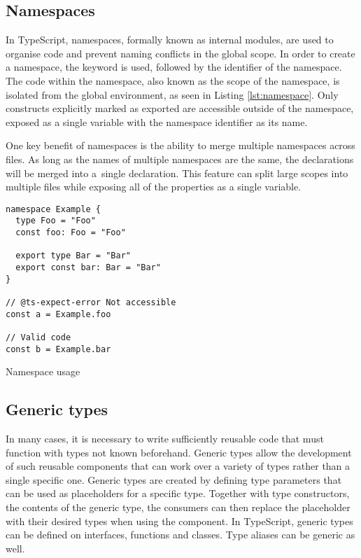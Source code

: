 \subsection{Namespaces}

In TypeScript, namespaces, formally known as internal modules, are used to organise code and prevent naming conflicts in the global scope. In order to create a namespace, the  keyword is used, followed by the identifier of the namespace. The code within the namespace, also known as the scope of the namespace, is isolated from the global environment, as seen in Listing \ref{lst:namespace}. Only constructs explicitly marked as exported are accessible outside of the namespace, exposed as a single variable with the namespace identifier as its name.

One key benefit of namespaces is the ability to merge multiple namespaces across files. As long as the names of multiple namespaces are the same, the declarations will be merged into a~single declaration. This feature can split large scopes into multiple files while exposing all of the properties as a single variable.

\clearpage

\begin{listing}[ht]
  \begin{verbatim}
namespace Example {
  type Foo = "Foo"
  const foo: Foo = "Foo"
  
  export type Bar = "Bar"
  export const bar: Bar = "Bar"
}

// @ts-expect-error Not accessible
const a = Example.foo 

// Valid code
const b = Example.bar
\end{verbatim}
  \caption{Namespace usage}\label{lst:namespace}
\end{listing}

\subsection{Generic types}

In many cases, it is necessary to write sufficiently reusable code that must function with types not known beforehand. Generic types allow the development of such reusable components that can work over a variety of types rather than a single specific one. Generic types are created by defining type parameters that can be used as placeholders for a specific type. Together with type constructors, the contents of the generic type, the consumers can then replace the placeholder with their desired types when using the component. In TypeScript, generic types can be defined on interfaces, functions and classes. Type aliases can be generic as well.

